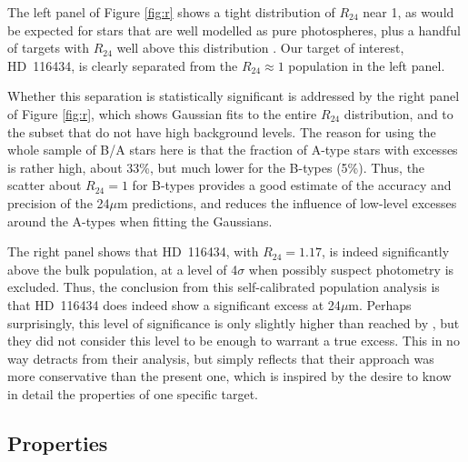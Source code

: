 \documentclass[a4paper,fleqn,usenatbib]{mnras}
\begin{document}
The left panel of Figure \ref{fig:r} shows a tight distribution of
$R_{24}$ near 1, as would be expected for stars that are well modelled
as pure photospheres, plus a handful of targets with $R_{24}$ well above
this distribution \citep[some are above the plotted range, see][for a
thorough discussion of the population
properties]{2012ApJ...756..133C}. Our target of interest, HD~116434, is
clearly separated from the $R_{24} \approx 1$ population in the left
panel.

Whether this separation is statistically significant is addressed by the
right panel of Figure \ref{fig:r}, which shows Gaussian fits to the
entire $R_{24}$ distribution, and to the subset that do not have high
background levels. The reason for using the whole sample of B/A stars
here is that the fraction of A-type stars with excesses is rather high,
about 33\%, but much lower for the B-types (5\%). Thus, the scatter
about $R_{24}=1$ for B-types provides a good estimate of the accuracy
and precision of the 24$\mu$m predictions, and reduces the influence of
low-level excesses around the A-types when fitting the Gaussians.

The right panel shows that HD~116434, with $R_{24}=1.17$, is indeed
significantly above the bulk population, at a level of 4$\sigma$ when
possibly suspect photometry is excluded. Thus, the conclusion from this
self-calibrated population analysis is that HD~116434 does indeed show a
significant excess at 24$\mu$m. Perhaps surprisingly, this level of
significance is only slightly higher than reached by
\citet{2012ApJ...756..133C}, but they did not consider this level to be
enough to warrant a true excess. This in no way detracts from their
analysis, but simply reflects that their approach was more conservative
than the present one, which is inspired by the desire to know in detail
the properties of one specific target.

\subsection{Properties}\label{s:hd116434:ss:prop}
\end{document}
